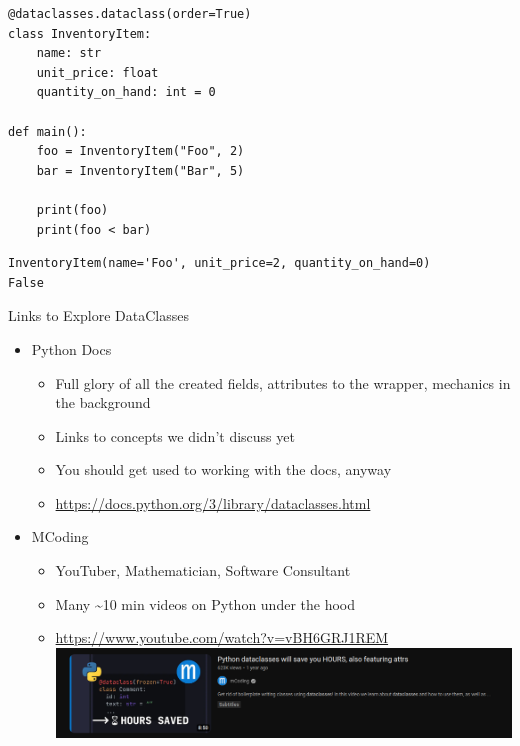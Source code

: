 
\begin{frame}[fragile]
%
\begin{codebox}
\begin{verbatim}
@dataclasses.dataclass(order=True)
class InventoryItem:
    name: str
    unit_price: float
    quantity_on_hand: int = 0

def main():
    foo = InventoryItem("Foo", 2)
    bar = InventoryItem("Bar", 5)

    print(foo)
    print(foo < bar)
\end{verbatim}
\end{codebox}
%
\begin{cmdbox}
\begin{verbatim}
InventoryItem(name='Foo', unit_price=2, quantity_on_hand=0)
False
\end{verbatim}
\end{cmdbox}
%
\end{frame}


\begin{frame}{Links to Explore DataClasses}
%
\begin{itemize}
\item Python Docs
	\begin{itemize}
	\item Full glory of all the created fields, attributes to the wrapper, mechanics in the background
	\item Links to concepts we didn't discuss yet
	\item You should get used to working with the docs, anyway
	\item \url{https://docs.python.org/3/library/dataclasses.html}
	\end{itemize}
\item MCoding
	\begin{itemize}
	\item YouTuber, Mathematician, Software Consultant
	\item Many \textasciitilde 10 min videos on Python under the hood
	\item \url{https://www.youtube.com/watch?v=vBH6GRJ1REM} \\
		\includegraphics[width=.8\linewidth]{./gfx/09-mcoding-dataclasses}
	\end{itemize}
\end{itemize}
%
\end{frame}

